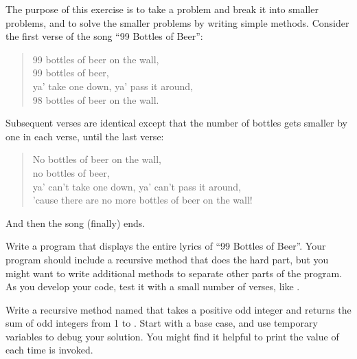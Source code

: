 \begin{exercise}  %

The purpose of this exercise is to take a problem and break it into smaller problems, and to solve the smaller problems by writing simple methods.
Consider the first verse of the song ``99 Bottles of Beer'':

\begin{quote}
99 bottles of beer on the wall,\\
99 bottles of beer,\\
ya' take one down, ya' pass it around,\\
98 bottles of beer on the wall.
\end{quote}

Subsequent verses are identical except that the number of bottles gets smaller by one in each verse, until the last verse:

\begin{quote}
No bottles of beer on the wall,\\
no bottles of beer,\\
ya' can't take one down, ya' can't pass it around,\\
'cause there are no more bottles of beer on the wall!
\end{quote}

And then the song (finally) ends.

Write a program that displays the entire lyrics of ``99 Bottles of Beer''.
Your program should include a recursive method that does the hard part, but you might want to write additional methods to separate other parts of the program.
As you develop your code, test it with a small number of verses, like .

\end{exercise}


\begin{exercise}  %

Write a recursive method named  that takes a positive odd integer  and returns the sum of odd integers from 1 to .
Start with a base case, and use temporary variables to debug your solution.
You might find it helpful to print the value of  each time  is invoked.

\end{exercise}


